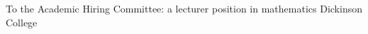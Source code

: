 \documentclass[11pt]{letter}
\begin{document}









\coverletter
  {}
  {To the Academic Hiring Committee:}
  {a lecturer position in mathematics}
  {\mathjobs}
  {}
  {Dickinson College}
  {\generic}
\end{document}
